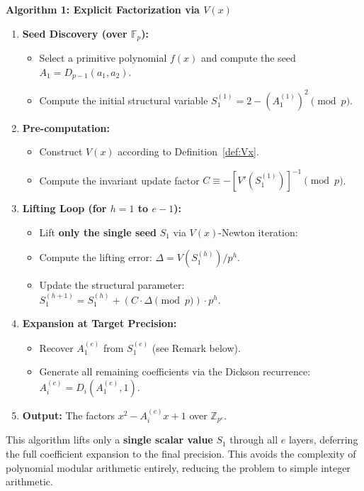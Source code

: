 \documentclass[12pt]{article}
\theoremstyle{plain}
\numberwithin{equation}{section}
\begin{document}
\noindent\textbf{Algorithm 1: Explicit Factorization via $V(x)$}
\begin{enumerate}
    \item \textbf{Seed Discovery (over $\mathbb{F}_p$):}
    \begin{itemize}
        \item Select a primitive polynomial $f(x)$ and compute the seed $A_1 = D_{p-1}(a_1, a_2)$.
        \item Compute the initial structural variable $S_1^{(1)} = 2 - (A_1^{(1)})^2 \pmod p$.
    \end{itemize}
    
    \item \textbf{Pre-computation:}
    \begin{itemize}
        \item Construct $V(x)$ according to Definition~\ref{def:Vx}.
        \item Compute the invariant update factor $C \equiv -[V'(S_1^{(1)})]^{-1} \pmod p$.
    \end{itemize}
    
    \item \textbf{Lifting Loop (for $h = 1$ to $e-1$):}
    \begin{itemize}
        \item Lift \textbf{only the single seed} $S_1$ via $V(x)$-Newton iteration:
        \item Compute the lifting error: $\Delta = V(S_1^{(h)}) / p^h$.
        \item Update the structural parameter: $S_1^{(h+1)} = S_1^{(h)} + (C \cdot \Delta \pmod p) \cdot p^h$.
    \end{itemize}
    
    \item \textbf{Expansion at Target Precision:}
    \begin{itemize}
        \item Recover $A_1^{(e)}$ from $S_1^{(e)}$ (see Remark below).
        \item Generate all remaining coefficients via the Dickson recurrence: $A_i^{(e)} = D_i(A_1^{(e)}, 1)$.
    \end{itemize}
    
    \item \textbf{Output:} The factors $x^2 - A_i^{(e)} x + 1$ over $\mathbb{Z}_{p^e}$.
\end{enumerate}

This algorithm lifts only a \textbf{single scalar value} $S_1$ through all $e$ layers, deferring the full coefficient expansion to the final precision. This avoids the complexity of polynomial modular arithmetic entirely, reducing the problem to simple integer arithmetic.
\end{document}
